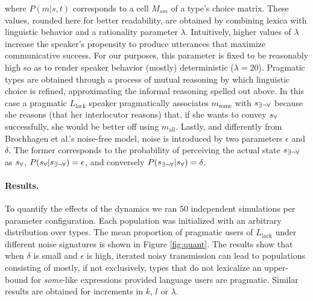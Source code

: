 \documentclass[10pt,a4paper]{article}
\newcommand{\state}{\ensuremath{s}\xspace}		%
\newcommand{\mystate}[1]{\ensuremath{\state_{\text{#1}}}\xspace} %
\newcommand{\messg}{\ensuremath{m}\xspace}		%
\newcommand{\mymessg}[1]{\ensuremath{\messg_{\text{#1}}}\xspace} %
\newcommand{\ssome}{\mystate{\ensuremath{\exists\neg\forall}}}
\newcommand{\sall}{\mystate{\ensuremath{\forall}}}
\newcommand{\msome}{\mymessg{some}}
\newcommand{\mall}{\mymessg{all}}
\begin{document}
where $P(m|s,t)$ corresponds to a cell $M_{sm}$ of a type's choice matrix. These values, rounded here for better readability, are obtained by combining lexica with linguistic behavior and a rationality parameter $\lambda$. Intuitively, higher values of $\lambda$ increase the speaker's propensity to produce utterances that maximize communicative success. For our purposes, this parameter is fixed to be reasonably high so as to render speaker behavior (mostly) deterministic ($\lambda = 20$). Pragmatic types are obtained through a process of mutual reasoning by which linguistic choice is refined, approximating the informal reasoning spelled out above. In this case a pragmatic $L_{\text{lack}}$ speaker pragmatically associates $\msome$ with $\ssome$ because she reasons (that her interlocutor reasons) that, if she wants to convey $\sall$ successfully, she would be better off using $\mall$. Lastly, and differently from Brochhagen et al.'s noise-free model, noise is introduced by two parameters $\epsilon$ and $\delta$. The former corresponds to the probability of perceiving the actual state $\ssome$ as $\sall$, $P(\sall | \ssome) = \epsilon$, and conversely $P(\ssome | \sall) = \delta$.

\paragraph{Results.} To quantify the effects of the dynamics we ran $50$ independent
simulations per parameter configuration. Each population was initialized with an arbitrary
distribution over types. The mean proportion of pragmatic users of $L_{\text{lack}}$ under
different noise signatures is shown in Figure \ref{fig:quant}. The results show that when
$\delta$ is small and $\epsilon$ is high, iterated noisy transmission can lead to populations
consisting of mostly, if not exclusively, types that do not lexicalize an upper-bound for {\em some}-like expressions provided language users are pragmatic.  Similar results are obtained for
increments in $k$, $l$ or $\lambda$.
\end{document}
